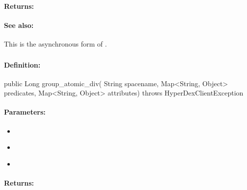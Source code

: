 \paragraph{Returns:}


\paragraph{See also:}  This is the asynchronous form of .

\pagebreak
\subsubsection{}
\label{api:java:group_atomic_div}


\paragraph{Definition:}
\begin{javacode}
public Long group_atomic_div(
        String spacename,
        Map<String, Object> predicates,
        Map<String, Object> attributes) throws HyperDexClientException
\end{javacode}

\paragraph{Parameters:}
\begin{itemize}[noitemsep]
\item {}\\

\item {}\\

\item {}\\

\end{itemize}

\paragraph{Returns:}


